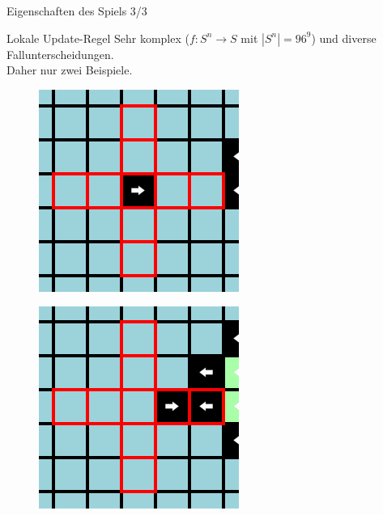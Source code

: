 \documentclass[aspectratio=169]{beamer}
\begin{document}
  \begin{frame}{Eigenschaften des Spiels 3/3}
    \begin{block}{Lokale Update-Regel}
      Sehr komplex ($f: S^n \to S$ mit $|S^n| = 96^9$) und diverse Fallunterscheidungen. \\
      Daher nur zwei Beispiele.
    \end{block}

    \begin{multicols*}{3}

      \begin{figure}[H]
        \centering
        \includegraphics[width = 0.39 \textheight]{example2n_1.png}
      \end{figure}

      \vfill\null

      \pause

      \begin{figure}[H]
        \centering
        \includegraphics[width = 0.39 \textheight]{example2n_2.png}
      \end{figure}

      \vfill\null

      \pause



\end{multicols*}
\end{frame}
\end{document}
